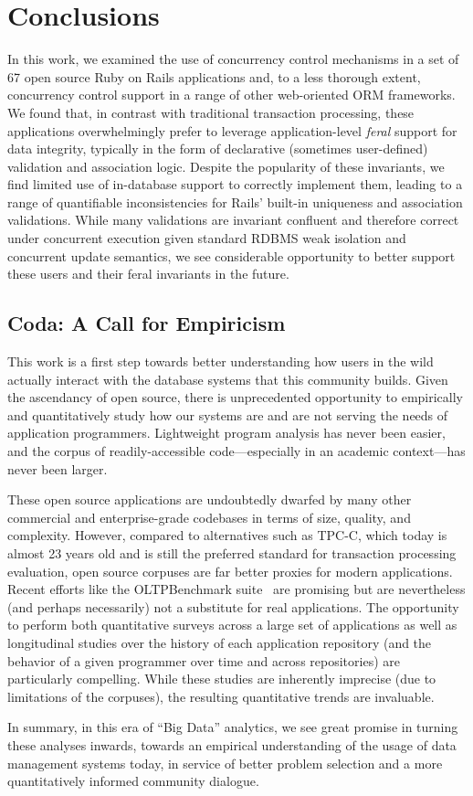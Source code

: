 
\section{Conclusions}
\label{sec:conclusion}

In this work, we examined the use of concurrency control mechanisms in
a set of 67 open source Ruby on Rails applications and, to a less
thorough extent, concurrency control support in a range of other
web-oriented ORM frameworks. We found that, in contrast with
traditional transaction processing, these applications overwhelmingly
prefer to leverage application-level \textit{feral} support for data
integrity, typically in the form of declarative (sometimes
user-defined) validation and association logic. Despite the popularity
of these invariants, we find limited use of in-database support to
correctly implement them, leading to a range of quantifiable
inconsistencies for Rails' built-in uniqueness and association
validations. While many validations are invariant confluent and
therefore correct under concurrent execution given standard RDBMS weak
isolation and concurrent update semantics, we see considerable
opportunity to better support these users and their feral invariants
in the future.


\subsection*{Coda: A Call for Empiricism}

This work is a first step towards better understanding how users in
the wild actually interact with the database systems that this
community builds. Given the ascendancy of open source, there is
unprecedented opportunity to empirically and quantitatively study how
our systems are and are not serving the needs of application
programmers. Lightweight program analysis has never been easier, and
the corpus of readily-accessible code---especially in an academic
context---has never been larger.

These open source applications are undoubtedly dwarfed by many other
commercial and enterprise-grade codebases in terms of size, quality,
and complexity. However, compared to alternatives such as TPC-C, which
today is almost 23 years old and is still the preferred standard for
transaction processing evaluation, open source corpuses are far better
proxies for modern applications. Recent efforts like the OLTPBenchmark
suite~\cite{oltpbench} are promising but are nevertheless (and perhaps
necessarily) not a substitute for real applications. The opportunity
to perform both quantitative surveys across a large set of
applications as well as longitudinal studies over the history of each
application repository (and the behavior of a given programmer over
time and across repositories) are particularly compelling. While these
studies are inherently imprecise (due to limitations of the corpuses),
the resulting quantitative trends are invaluable.

In summary, in this era of ``Big Data'' analytics, we see great
promise in turning these analyses inwards, towards an empirical
understanding of the usage of data management systems today, in service of
better problem selection and a more quantitatively informed community
dialogue.

